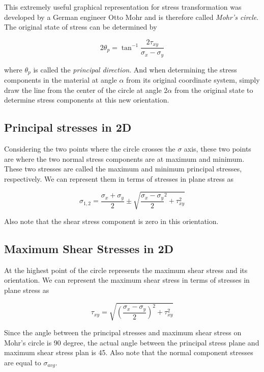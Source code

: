 \documentclass[
10pt,
a4paper,
openany,
svgnames,
]{book}
\begin{document}
This extremely useful graphical representation for stress transformation was developed by a German engineer Otto Mohr and is therefore called \emph{Mohr’s circle}.
The original state of stress can be determined by

\begin{equation}
  2\theta_p = \tan ^{-1}\frac{2\tau_{xy}}{\sigma_x - \sigma_y}
\end{equation}

where $\theta _p$ is called the \emph{principal direction}. And when determining the stress components in the material at angle $\alpha$ from its original coordinate system, simply draw the line from the center of the circle at angle $2\alpha$ from the original state to determine stress components at this new orientation.

\subsection{Principal stresses in 2D}

Considering the two points where the circle crosses the $\sigma$ axis, these two points are where the two normal stress components are at maximum and minimum. These two stresses are called the maximum and minimum principal stresses, respectively. We can represent them in terms of stresses in plane stress as

\begin{equation}
  \sigma_{1,2} = \frac{\sigma_x + \sigma_y}{2} \pm \sqrt {\frac{\sigma_x - \sigma_y}{2}^2 + \tau_{xy}^2}
\end{equation}

Also note that the shear stress component is zero in this orientation.

\subsection{Maximum Shear Stresses in 2D}

At the highest point of the circle represents the maximum shear stress and its orientation. We can represent the maximum shear stress in terms of stresses in plane stress as

\begin{equation} \label{eqn: max shear stress}
  \tau_{xy} = \sqrt {\left( \frac{\sigma_x - \sigma_y}{2} \right)^2 + \tau_{xy}^2}
\end{equation}

Since the angle between the principal stresses and maximum shear stress on Mohr’s circle is 90 degree, the actual angle between the principal stress plane and maximum shear stress plan is 45. Also note that the normal component stresses are equal to $\sigma_{avg}$.
\end{document}
